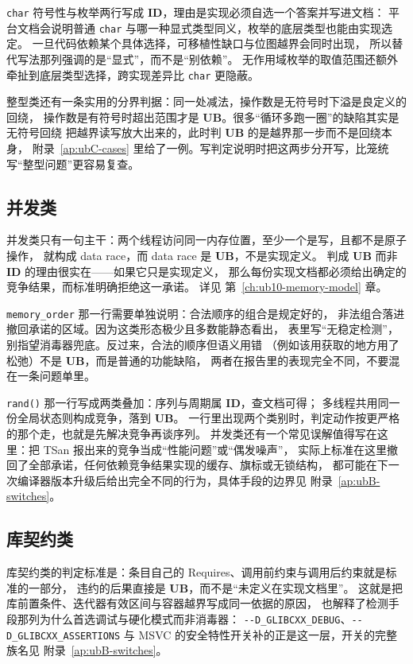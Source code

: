 \documentclass[12pt,a4paper,fontset=fandol]{ctexbook}
\newcommand{\Fn}[1]{\texttt{#1()}}
\newcommand{\Tp}[1]{\texttt{#1}}
\newcommand{\Opt}[1]{\texttt{-\/-#1}}
\newcommand{\Bk}{\discretionary{}{}{}}
\newcommand{\UB}{\textbf{\textsf{UB}}}
\newcommand{\IDB}{\textbf{\textsf{ID}}}
\newcommand{\Mx}[1]{\textsf{#1}}
\begin{document}
\Tp{char} 符号性与枚举两行写成 \IDB{}，理由是实现必须自选一个答案并写进文档：
平台文档会说明普通 \Tp{char} 与哪一种显式类型同义，枚举的底层类型也能由实现选定。
一旦代码依赖某个具体选择，可移植性缺口与位图越界会同时出现，
所以替代写法那列强调的是“显式”，而不是“别依赖”。
无作用域枚举的取值范围还额外牵扯到底层类型选择，跨实现差异比 \Tp{char} 更隐蔽。

整型类还有一条实用的分界判据：同一处减法，操作数是无符号时下溢是良定义的回绕，
操作数是有符号时超出范围才是 \UB{}。很多“循环多跑一圈”的缺陷其实是无符号回绕
把越界读写放大出来的，此时判 \UB{} 的是越界那一步而不是回绕本身，
附录~\ref{ap:ubC-cases} 里给了一例。写判定说明时把这两步分开写，比笼统写“整型问题”更容易复查。

\subsection{并发类}

并发类只有一句主干：两个线程访问同一内存位置，至少一个是写，且都不是原子操作，
就构成 data race，而 data race 是 \UB{}，不是实现定义。
判成 \UB{} 而非 \IDB{} 的理由很实在——如果它只是实现定义，
那么每份实现文档都必须给出确定的竞争结果，而标准明确拒绝这一承诺。
详见 第~\ref{ch:ub10-memory-model} 章。

\Tp{memory\_order} 那一行需要单独说明：合法顺序的组合是规定好的，
非法组合落进撤回承诺的区域。因为这类形态极少且多数能静态看出，
表里写“无稳定检测”，别指望消毒器兜底。反过来，合法的顺序但语义用错
（例如该用获取的地方用了松弛）不是 \UB{}，而是普通的功能缺陷，
两者在报告里的表现完全不同，不要混在一条问题单里。

\Fn{rand} 那一行写成两类叠加：序列与周期属 \IDB{}，查文档可得；
多线程共用同一份全局状态则构成竞争，落到 \UB{}。
一行里出现两个类别时，判定动作按更严格的那个走，也就是先解决竞争再谈序列。
并发类还有一个常见误解值得写在这里：把 \Mx{TSan} 报出来的竞争当成“性能问题”或“偶发噪声”，
实际上标准在这里撤回了全部承诺，任何依赖竞争结果实现的缓存、旗标或无锁结构，
都可能在下一次编译器版本升级后给出完全不同的行为，具体手段的边界见 附录~\ref{ap:ubB-switches}。

\subsection{库契约类}

库契约类的判定标准是：条目自己的 Requires、调用前约束与调用后约束就是标准的一部分，
违约的后果直接是 \UB{}，而不是“未定义在实现文档里”。
这就是把库前置条件、迭代器有效区间与容器越界写成同一依据的原因，
也解释了检测手段那列为什么首选调试与硬化模式而非消毒器：
\Opt{D{\Bk}\_GLIBCXX{\Bk}\_DEBUG}、\Opt{D{\Bk}\_GLIBCXX{\Bk}\_ASSERTIONS}
与 \Mx{MSVC} 的安全特性开关补的正是这一层，开关的完整族名见 附录~\ref{ap:ubB-switches}。
\end{document}
